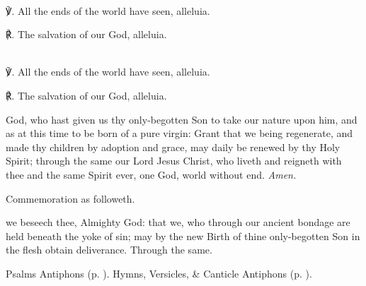 \mattins

\\

℣. All the ends of the world have seen, alleluia.

℟. The salvation of our God, alleluia.


\secondEvensong

\\

℣. All the ends of the world have seen, alleluia.

℟. The salvation of our God, alleluia.


\clearpage
\collect
{} God, who hast given us thy only-begotten Son to take our nature upon him, and as at this time to be born of a pure virgin: Grant that we being regenerate, and made thy children by adoption and grace, may daily be renewed by thy Holy Spirit; through the same our Lord Jesus Christ, who liveth and reigneth with thee and the same Spirit ever, one God, world without end. \textit{Amen.}

\begin{rubric}
    Commemoration  as followeth.
\end{rubric}

 we beseech thee, Almighty God: that we, who through our ancient bondage are held beneath the yoke of sin; may by the new Birth of thine only-begotten Son in the flesh obtain deliverance. Through the same.


\label{Sylvester}


\begin{rubric}
	Psalms Antiphons  (p. \pageref{Christmas}). Hymns, Versicles, \& Canticle Antiphons  (p. \pageref{CommonConfessorBishop}).
\end{rubric}

